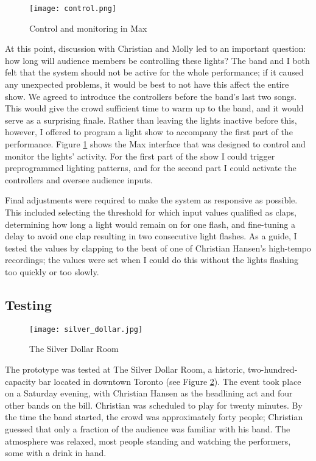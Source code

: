 \begin{figure}
	\centering

	\texttt{[image: control.png]}
	\caption{Control and monitoring in Max}

	\label{prototyping3.7}
\end{figure}

At this point, discussion with Christian and Molly led to an important question: how long will audience members be controlling these lights? The band and I both felt that the system should not be active for the whole performance; if it caused any unexpected problems, it would be best to not have this affect the entire show. We agreed to introduce the controllers before the band's last two songs. This would give the crowd sufficient time to warm up to the band, and it would serve as a surprising finale. Rather than leaving the lights inactive before this, however, I offered to program a light show to accompany the first part of the performance. Figure \ref{prototyping3.7} shows the Max interface that was designed to control and monitor the lights' activity. For the first part of the show I could trigger preprogrammed lighting patterns, and for the second part I could activate the controllers and oversee audience inputs.

Final adjustments were required to make the system as responsive as possible. This included selecting the threshold for which input values qualified as claps, determining how long a light would remain on for one flash, and fine-tuning a delay to avoid one clap resulting in two consecutive light flashes. As a guide, I tested the values by clapping to the beat of one of Christian Hansen's high-tempo recordings; the values were set when I could do this without the lights flashing too quickly or too slowly.

\subsection{Testing}

\begin{figure}
	\centering

	\texttt{[image: silver\_dollar.jpg]}
	\caption{The Silver Dollar Room}

	\label{prototyping3.8}
\end{figure}

The prototype was tested at The Silver Dollar Room, a historic, two-hundred-capacity bar located in downtown Toronto (see Figure \ref{prototyping3.8}). The event took place on a Saturday evening, with Christian Hansen as the headlining act and four other bands on the bill. Christian was scheduled to play for twenty minutes. By the time the band started, the crowd was approximately forty people; Christian guessed that only a fraction of the audience was familiar with his band. The atmosphere was relaxed, most people standing and watching the performers, some with a drink in hand.

